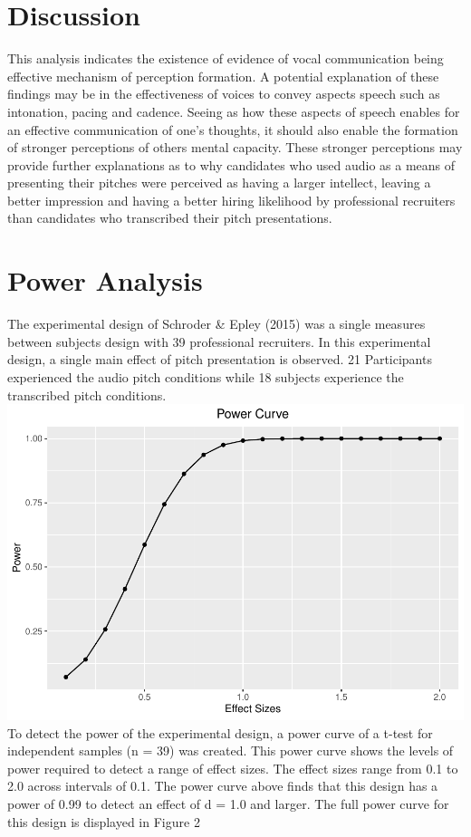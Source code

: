 \documentclass[
  english,
  man,floatsintext]{apa6}
\begin{document}
\hypertarget{discussion}{%
\section{Discussion}\label{discussion}}

This analysis indicates the existence of evidence of vocal communication being effective mechanism of perception formation. A potential explanation of these findings may be in the effectiveness of voices to convey aspects speech such as intonation, pacing and cadence. Seeing as how these aspects of speech enables for an effective communication of one's thoughts, it should also enable the formation of stronger perceptions of others mental capacity. These stronger perceptions may provide further explanations as to why candidates who used audio as a means of presenting their pitches were perceived as having a larger intellect, leaving a better impression and having a better hiring likelihood by professional recruiters than candidates who transcribed their pitch presentations.

\hypertarget{power-analysis}{%
\section{Power Analysis}\label{power-analysis}}

The experimental design of Schroder \& Epley (2015) was a single measures between subjects design with 39 professional recruiters. In this experimental design, a single main effect of pitch presentation is observed. 21 Participants experienced the audio pitch conditions while 18 subjects experience the transcribed pitch conditions.
\includegraphics{PapajaPaper_Poweranalysis_files/figure-latex/unnamed-chunk-3-1.pdf}
To detect the power of the experimental design, a power curve of a t-test for independent samples (n = 39) was created. This power curve shows the levels of power required to detect a range of effect sizes. The effect sizes range from 0.1 to 2.0 across intervals of 0.1. The power curve above finds that this design has a power of 0.99 to detect an effect of d = 1.0 and larger. The full power curve for this design is displayed in Figure 2
\end{document}
